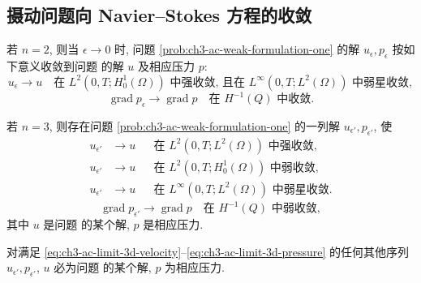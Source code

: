\subsection{摄动问题向 Navier--Stokes 方程的收敛}
\label{subsec:ch3-ac-limit}

\begin{Theorem}
\label{thm:ch3-ac-limit-two-dimensional}
若 $n=2$, 则当 $\epsilon\to0$ 时, 问题 \ref{prob:ch3-ac-weak-formulation-one} 的解 $u_\epsilon,p_\epsilon$ 按如下意义收敛到问题  的解 $u$ 及相应压力 $p$:
\begin{equation}
u_\epsilon\longrightarrow u
\quad\text{在 }L^2(0,T;H_0^1(\Omega))\text{ 中强收敛, 且在 }
L^\infty(0,T;L^2(\Omega))\text{ 中弱星收敛},
\label{eq:ch3-ac-limit-2d-velocity}
\end{equation}
\begin{equation}
\operatorname{grad}p_\epsilon\longrightarrow\operatorname{grad}p
\quad\text{在 }H^{-1}(Q)\text{ 中收敛}.
\label{eq:ch3-ac-limit-2d-pressure}
\end{equation}
\end{Theorem}

\begin{Theorem}
\label{thm:ch3-ac-limit-three-dimensional}
若 $n=3$, 则存在问题 \ref{prob:ch3-ac-weak-formulation-one} 的一列解 $u_{\epsilon'},p_{\epsilon'}$, 使
\begin{equation}
\begin{aligned}
u_{\epsilon'}&\longrightarrow u
&&\text{在 }L^2(0,T;L^2(\Omega))\text{ 中强收敛},\\
u_{\epsilon'}&\longrightarrow u
&&\text{在 }L^2(0,T;H_0^1(\Omega))\text{ 中弱收敛},\\
u_{\epsilon'}&\longrightarrow u
&&\text{在 }L^\infty(0,T;L^2(\Omega))\text{ 中弱星收敛}.
\end{aligned}
\label{eq:ch3-ac-limit-3d-velocity}
\end{equation}
\begin{equation}
\operatorname{grad}p_{\epsilon'}\longrightarrow\operatorname{grad}p
\quad\text{在 }H^{-1}(Q)\text{ 中弱收敛},
\label{eq:ch3-ac-limit-3d-pressure}
\end{equation}
其中 $u$ 是问题  的某个解, $p$ 是相应压力.

对满足 \eqref{eq:ch3-ac-limit-3d-velocity}--\eqref{eq:ch3-ac-limit-3d-pressure} 的任何其他序列 $u_{\epsilon'},p_{\epsilon'}$, $u$ 必为问题  的某个解, $p$ 为相应压力.
\end{Theorem}

